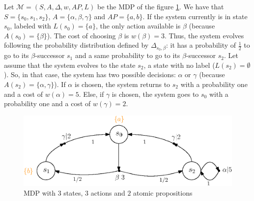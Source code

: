 \begin{example}\label{simple-mdp}
  Let $\mathcal{M} = (S, A, \Delta, w, AP, L)$ be the MDP of the figure \ref{mdp01}. We have that $S = \{s_0, s_1, s_2\}$, $A = \{\alpha, \beta, \gamma\}$ and $AP=\{a, b\}$. If the system currently is in state $s_0$, labeled with $L(s_0) = \{a\}$, the only action available is $\beta$ (because $A(s_0) = \{\beta\}$).
  The cost of choosing $\beta$ is $w(\beta) = 3$.
  Thus, the system evolves following the probability distribution defined by $\Delta_{s_0, \beta}$: it has a probability of $\frac{1}{2}$
  to go to its $\beta$-successor $s_1$ and a same probability to go to its $\beta$-successor $s_2$. Let assume that the system evolves to the state $s_2$, a state with no label ($L(s_2) = \emptyset$). So, in that case, the system has two possible decisions: $\alpha$ or $\gamma$ (because $A(s_2) = \{\alpha, \gamma\}$). If $\alpha$ is chosen, the system returns to $s_2$ with a probability one and a cost of $w(\alpha) = 5$. Else, if $\gamma$ is chosen, the system goes to $s_0$ with a probability one and a cost of $w(\gamma) = 2$.
  \begin{figure}[h!]
    \centering
    \includegraphics[width=0.7\linewidth]{resources/simple-mdp}
    \caption{MDP with $3$ states, $3$ actions and $2$ atomic propositions}\label{mdp01}
  \end{figure}
\end{example}

